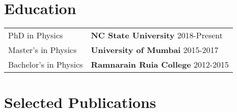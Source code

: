 \documentclass[a4paper,10pt]{article}
\begin{document}
\section{Education}
\begin{tabularx}{\linewidth}{@{}l X@{}}	
PhD in Physics & \textbf{NC State University} \hfill 2018-Present \\
Master's in Physics & \textbf{University of Mumbai} \hfill 2015-2017 \\ 
Bachelor's in Physics & \textbf{Ramnarain Ruia College} \hfill  2012-2015 \\
\end{tabularx}

\section{Selected Publications}
\begin{refsection}
\nocite{*}
\printbibliography[heading=none]
\end{refsection}
\vfill
\end{document}
